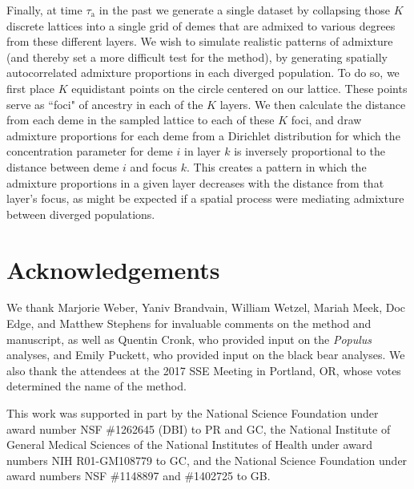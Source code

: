 \documentclass[10pt,letterpaper]{article}
\newif\ifsubmissionversion
\newif\ifincludesupplement
\begin{document}
Finally, at time $\tau_{\text{a}}$ in the past 
we generate a single dataset 
by collapsing those $K$ discrete lattices into a single grid of demes 
that are admixed to various degrees from these different layers. 
We wish to simulate realistic patterns of admixture 
(and thereby set a more difficult test for the method), 
by generating spatially autocorrelated admixture proportions 
in each diverged population.
To do so, we first place $K$ equidistant points on the circle centered on our lattice.  
These points serve as ``foci" of ancestry in each of the $K$ layers.  
We then calculate the distance from each deme in the sampled lattice to each of these $K$ foci, 
and draw admixture proportions for each deme 
from a Dirichlet distribution for which the concentration parameter 
for deme $i$ in layer $k$ is inversely proportional to the distance between deme $i$ and focus $k$. 
This creates a pattern in which the admixture proportions in a given layer decreases 
with the distance from that layer's focus, 
as might be expected if a spatial process were mediating admixture between diverged populations.

\section*{Acknowledgements}

We thank Marjorie Weber, Yaniv Brandvain, William Wetzel, 
Mariah Meek, Doc Edge, and Matthew Stephens 
for invaluable comments on the method and manuscript, 
as well as Quentin Cronk, who provided input on the \textit{Populus} analyses, 
and Emily Puckett, who provided input on the black bear analyses.
We also thank the attendees at the 2017 SSE Meeting in Portland, OR, 
whose votes determined the name of the method.
\ifsubmissionversion
\else
This work was supported in part by 
the National Science Foundation under award number NSF \#1262645 (DBI) to PR and GC, 
the National Institute of General Medical Sciences of the National
Institutes of Health under award numbers NIH R01-GM108779 to GC,
and the National Science Foundation under award numbers NSF \#1148897 and \#1402725 to GB.
\fi


\newpage
\clearpage



\ifincludesupplement

\clearpage
\newpage
\end{document}
